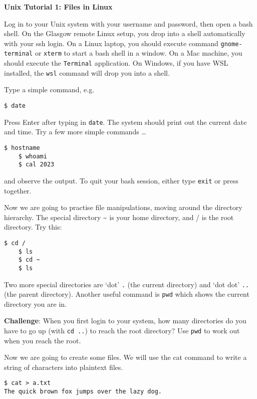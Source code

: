 \documentclass{article}
\begin{document}
\noindent
{\Large \textsf{\textbf{Unix Tutorial 1: Files in Linux}}}

\bigskip


Log in to your Unix system with your username and password, then
open a bash shell. On the Glasgow remote Linux setup, you drop into a shell automatically with your ssh login. On a Linux laptop, you should execute command \texttt{gnome-terminal} or \texttt{xterm} to start a bash shell in a window. On a Mac machine, you should execute the \texttt{Terminal} application. On Windows, if you have WSL installed, the \texttt{wsl} command will drop you into a shell.

Type a simple command, e.g.\
\begin{lstlisting}[style=BashInputStyle]
    $ date
\end{lstlisting}
Press Enter after typing in \lstinline{date}. The system should print out the current date and time.
Try a few more simple commands \ldots
\begin{lstlisting}[style=BashInputStyle]
    $ hostname
    $ whoami
    $ cal 2023
\end{lstlisting}

and observe the output.
To quit your bash session, either type \lstinline{exit} or press
\keys{\ctrl + D} together.




Now we are going to practise file manipulations, moving around the directory hierarchy. The special directory \~{} is your home directory, and / is the root directory. Try this:


\begin{lstlisting}[style=BashInputStyle]
    $ cd /
    $ ls
    $ cd ~
    $ ls
\end{lstlisting}

Two more special directories are `dot' \texttt{.} (the current directory)  and `dot dot' \texttt{..} (the parent directory). Another useful command is \texttt{pwd} which shows the current directory you are in.

\textbf{Challenge}: When you first login to your system, how many directories do you have to go up (with \texttt{cd ..}) to reach the root directory? Use \texttt{pwd} to work out when you reach the root.

Now we are going to create some files. We will use the cat command to write a string of characters into plaintext files.

\begin{lstlisting}[style=BashInputStyle]
    $ cat > a.txt
The quick brown fox jumps over the lazy dog.
\end{lstlisting}
\end{document}
